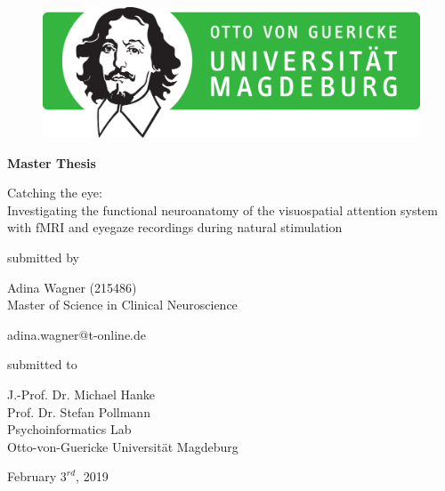 \documentclass[a4paper, 11pt]{scrreprt}
\begin{document}

\begin{figure}[h]
\vspace{-1.5cm}
\hspace{9.5cm}
\includegraphics[scale=0.5]{img/ovgu_nat_logo}
\label{logoOVGU}
\end{figure}

\begin{center}
\bigskip
\begin{LARGE}
\textbf{Master Thesis}
\end{LARGE}

\vspace{\fill}

\begin{huge}
 
Catching the eye: \\
Investigating the functional neuroanatomy of the visuospatial attention system with fMRI and eyegaze recordings during natural stimulation

\end{huge}

\vspace{\fill}

submitted by\\
\begin{large}
Adina Wagner (215486) \\
\vspace{0.3cm}
Master of Science in Clinical Neuroscience\\
\begin{normalsize}
adina.wagner@t-online.de 
\end{normalsize}

\vspace{\fill}

\begin{normalsize}
submitted to\\
\end{normalsize}
J.-Prof. Dr. Michael Hanke\\
Prof. Dr. Stefan Pollmann\\
\vspace{0.5cm}
Psychoinformatics Lab\\
Otto-von-Guericke Universität Magdeburg\\
\end{large}

\vspace{1cm}

February $3^{rd}$, 2019

\thispagestyle{empty}
\end{center}
\clearpage
\end{document}
